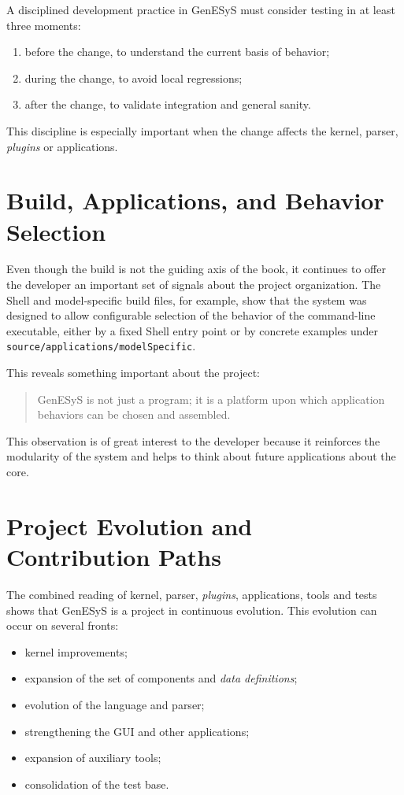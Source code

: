 A disciplined development practice in GenESyS must consider testing in at least three moments:
\begin{enumerate}
 \item before the change, to understand the current basis of behavior;
 \item during the change, to avoid local regressions;
 \item after the change, to validate integration and general sanity.
\end{enumerate}

This discipline is especially important when the change affects the kernel, parser, \textit{plugins} or applications.

\section{Build, Applications, and Behavior Selection}
\label{sec:cap10_build_aplicacoes_selecao_comportamentos}

Even though the build is not the guiding axis of the book, it continues to offer the developer an important set of signals about the project organization. The Shell and model-specific build files, for example, show that the system was designed to allow configurable selection of the behavior of the command-line executable, either by a fixed Shell entry point or by concrete examples under \texttt{source/applications/modelSpecific}.

This reveals something important about the project:
\begin{quote}
 GenESyS is not just a program; it is a platform upon which application behaviors can be chosen and assembled.
\end{quote}

This observation is of great interest to the developer because it reinforces the modularity of the system and helps to think about future applications about the core.

\section{Project Evolution and Contribution Paths}
\label{sec:cap10_evolucao_projeto_caminhos_contribuicao}

The combined reading of kernel, parser, \textit{plugins}, applications, tools and tests shows that GenESyS is a project in continuous evolution. This evolution can occur on several fronts:
\begin{itemize}
 \item kernel improvements;
 \item expansion of the set of components and \textit{data definitions};
 \item evolution of the language and parser;
 \item strengthening the GUI and other applications;
 \item expansion of auxiliary tools;
 \item consolidation of the test base.
\end{itemize}

